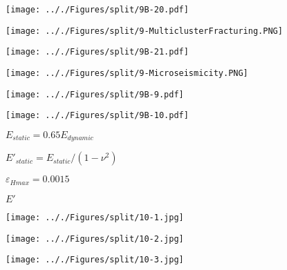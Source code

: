 \documentclass[onecolumn,11pt]{report}
\def\lthtmlcheckvsize{\ifdim\ht\sizebox<\vsize 
  \ifdim\wd\sizebox<\hsize\expandafter\hfill\fi \expandafter\vfill
  \else\expandafter\vss\fi}%
\begin{document}
{\newpage\clearpage
{}%
\texttt{[image: .././Figures/split/9B-20.pdf]}%
\lthtmlpictureZ
\lthtmlcheckvsize\clearpage}

{\newpage\clearpage
{}%
\texttt{[image: .././Figures/split/9-MulticlusterFracturing.PNG]}%
\lthtmlpictureZ
\lthtmlcheckvsize\clearpage}

{\newpage\clearpage
{}%
\texttt{[image: .././Figures/split/9B-21.pdf]}%
\lthtmlpictureZ
\lthtmlcheckvsize\clearpage}

{\newpage\clearpage
{}%
\texttt{[image: .././Figures/split/9-Microseismicity.PNG]}%
\lthtmlpictureZ
\lthtmlcheckvsize\clearpage}

{\newpage\clearpage
{}%
\texttt{[image: .././Figures/split/9B-9.pdf]}%
\lthtmlpictureZ
\lthtmlcheckvsize\clearpage}

{\newpage\clearpage
{}%
\texttt{[image: .././Figures/split/9B-10.pdf]}%
\lthtmlpictureZ
\lthtmlcheckvsize\clearpage}

{\newpage\clearpage
{}%
$ E_{static} = 0.65 E_{dynamic}$%
\lthtmlindisplaymathZ
\lthtmlcheckvsize\clearpage}

{\newpage\clearpage
{}%
$ E'_{static} = E_{static} / (1-\nu^2)$%
\lthtmlindisplaymathZ
\lthtmlcheckvsize\clearpage}

{\newpage\clearpage
{}%
$ \varepsilon_{Hmax} = 0.0015$%
\lthtmlindisplaymathZ
\lthtmlcheckvsize\clearpage}

{\newpage\clearpage
{}%
$ E'$%
\lthtmlindisplaymathZ
\lthtmlcheckvsize\clearpage}

{\newpage\clearpage
{}%
\texttt{[image: .././Figures/split/10-1.jpg]}%
\lthtmlpictureZ
\lthtmlcheckvsize\clearpage}

{\newpage\clearpage
{}%
\texttt{[image: .././Figures/split/10-2.jpg]}%
\lthtmlpictureZ
\lthtmlcheckvsize\clearpage}

{\newpage\clearpage
{}%
\texttt{[image: .././Figures/split/10-3.jpg]}%
\lthtmlpictureZ
\lthtmlcheckvsize\clearpage}
\end{document}
